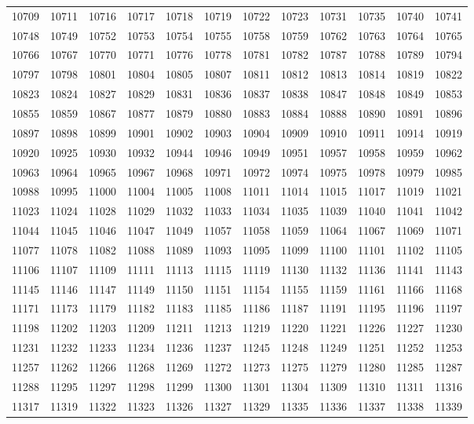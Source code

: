 \begin{center}
\begin{longtable}{llllllllllll}
10709 &10711 &10716 &10717 &10718 &10719 &10722 &10723 &10731 &10735 &10740 &10741 \\
10748 &10749 &10752 &10753 &10754 &10755 &10758 &10759 &10762 &10763 &10764 &10765 \\
10766 &10767 &10770 &10771 &10776 &10778 &10781 &10782 &10787 &10788 &10789 &10794 \\
10797 &10798 &10801 &10804 &10805 &10807 &10811 &10812 &10813 &10814 &10819 &10822 \\
10823 &10824 &10827 &10829 &10831 &10836 &10837 &10838 &10847 &10848 &10849 &10853 \\
10855 &10859 &10867 &10877 &10879 &10880 &10883 &10884 &10888 &10890 &10891 &10896 \\
10897 &10898 &10899 &10901 &10902 &10903 &10904 &10909 &10910 &10911 &10914 &10919 \\
10920 &10925 &10930 &10932 &10944 &10946 &10949 &10951 &10957 &10958 &10959 &10962 \\
10963 &10964 &10965 &10967 &10968 &10971 &10972 &10974 &10975 &10978 &10979 &10985 \\
10988 &10995 &11000 &11004 &11005 &11008 &11011 &11014 &11015 &11017 &11019 &11021 \\
11023 &11024 &11028 &11029 &11032 &11033 &11034 &11035 &11039 &11040 &11041 &11042 \\
11044 &11045 &11046 &11047 &11049 &11057 &11058 &11059 &11064 &11067 &11069 &11071 \\
11077 &11078 &11082 &11088 &11089 &11093 &11095 &11099 &11100 &11101 &11102 &11105 \\
11106 &11107 &11109 &11111 &11113 &11115 &11119 &11130 &11132 &11136 &11141 &11143 \\
11145 &11146 &11147 &11149 &11150 &11151 &11154 &11155 &11159 &11161 &11166 &11168 \\
11171 &11173 &11179 &11182 &11183 &11185 &11186 &11187 &11191 &11195 &11196 &11197 \\
11198 &11202 &11203 &11209 &11211 &11213 &11219 &11220 &11221 &11226 &11227 &11230 \\
11231 &11232 &11233 &11234 &11236 &11237 &11245 &11248 &11249 &11251 &11252 &11253 \\
11257 &11262 &11266 &11268 &11269 &11272 &11273 &11275 &11279 &11280 &11285 &11287 \\
11288 &11295 &11297 &11298 &11299 &11300 &11301 &11304 &11309 &11310 &11311 &11316 \\
11317 &11319 &11322 &11323 &11326 &11327 &11329 &11335 &11336 &11337 &11338 &11339 \\

\end{longtable}
\end{center}
